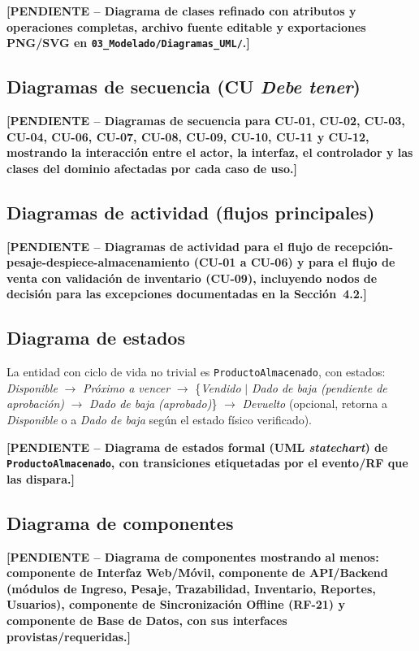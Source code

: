 \documentclass[11pt,a4paper]{article}
\newcommand{\PENDIENTE}[1]{\textcolor{pendiente}{\textbf{[PENDIENTE -- #1]}}}
\begin{document}
\PENDIENTE{Diagrama de clases refinado con atributos y operaciones completas, archivo fuente editable y exportaciones PNG/SVG en \texttt{03\_Modelado/Diagramas\_UML/}.}

\subsection{Diagramas de secuencia (CU \textit{Debe tener})}
\PENDIENTE{Diagramas de secuencia para CU-01, CU-02, CU-03, CU-04, CU-06, CU-07, CU-08, CU-09, CU-10, CU-11 y CU-12, mostrando la interacción entre el actor, la interfaz, el controlador y las clases del dominio afectadas por cada caso de uso.}

\subsection{Diagramas de actividad (flujos principales)}
\PENDIENTE{Diagramas de actividad para el flujo de recepción-pesaje-despiece-almacenamiento (CU-01 a CU-06) y para el flujo de venta con validación de inventario (CU-09), incluyendo nodos de decisión para las excepciones documentadas en la Sección~4.2.}

\subsection{Diagrama de estados}
La entidad con ciclo de vida no trivial es \texttt{ProductoAlmacenado}, con estados: \textit{Disponible} $\rightarrow$ \textit{Próximo a vencer} $\rightarrow$ \{\textit{Vendido} $\mid$ \textit{Dado de baja (pendiente de aprobación)} $\rightarrow$ \textit{Dado de baja (aprobado)}\} $\rightarrow$ \textit{Devuelto} (opcional, retorna a \textit{Disponible} o a \textit{Dado de baja} según el estado físico verificado).

\PENDIENTE{Diagrama de estados formal (UML \textit{statechart}) de \texttt{ProductoAlmacenado}, con transiciones etiquetadas por el evento/RF que las dispara.}

\subsection{Diagrama de componentes}
\PENDIENTE{Diagrama de componentes mostrando al menos: componente de Interfaz Web/Móvil, componente de API/Backend (módulos de Ingreso, Pesaje, Trazabilidad, Inventario, Reportes, Usuarios), componente de Sincronización Offline (RF-21) y componente de Base de Datos, con sus interfaces provistas/requeridas.}
\end{document}
